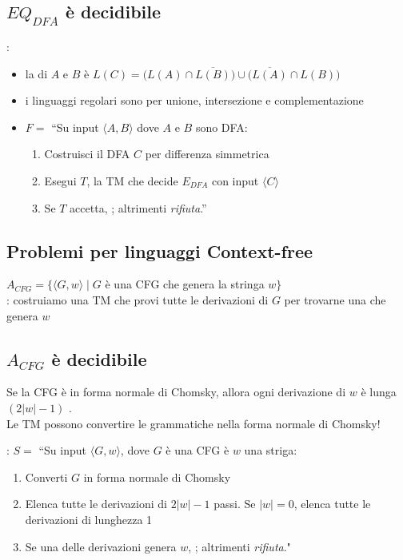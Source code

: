 \subsection{$EQ_{DFA}$ è decidibile}
: 
\begin{itemize}
	\item la  di $A$ e $B$ è 
  	$L(C)= \Big( L(A)\cap \overline{L(B)}\Big) \cup \Big(\overline{L(A)}\cap L(B)\Big)$ 
	\item i linguaggi regolari sono  per unione, intersezione e complementazione
	\item $F=$ ``Su input $\langle A,B \rangle$ dove $A$ e $B$ sono DFA: 
		\begin{enumerate}
			\item Costruisci il DFA $C$ per differenza simmetrica
			\item Esegui $T$, la TM che decide $E_{DFA}$ con input $\langle C\rangle$ 
			\item Se $T$ accetta, ; altrimenti \textit{rifiuta}.''
		\end{enumerate}
\end{itemize}

\subsection{Problemi per linguaggi Context-free}
$A_{CFG} = \{\langle G,w\rangle\mid G$ è una CFG che genera la stringa $w\}$ \\
: costruiamo una TM che provi tutte le derivazioni di $G$ per trovarne una che genera $w$ \\

\subsection{$A_{CFG}$ è decidibile}
Se la CFG è in forma normale di Chomsky, allora ogni derivazione di $w$ è lunga  $(2|w| -1)$ .\\
Le TM possono convertire le grammatiche nella forma normale di Chomsky!

:
$S=$ ``Su input $\langle G,w\rangle$, dove $G$ è una CFG è $w$ una striga:
\begin{enumerate}
	\item Converti $G$ in forma normale di Chomsky
	\item Elenca tutte le derivazioni di $2|w|-1$ passi. Se $|w| = 0$, elenca tutte le derivazioni di lunghezza 1
	\item Se una delle derivazioni genera $w$, ; altrimenti \textit{rifiuta}."
\end{enumerate}

